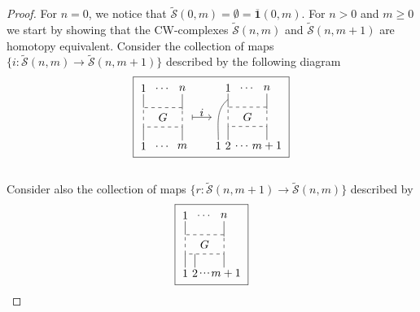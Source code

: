 \documentclass{amsart}
\renewcommand{\S}{\mathcal{S}}
\renewcommand{\1}{\mathbf{1}}
\theoremstyle{definition}
\begin{document}
\begin{proof} 			
	For $n=0$, we notice that $\tilde{\S}(0,m) = \emptyset = \overline{\1}(0,m)$. For $n>0$ and $m\geq0$ we start by showing that the CW-complexes $\tilde{\S}(n,m)$ and $\tilde{\S}(n,m+1)$ are homotopy equivalent. Consider the collection of maps $\{i:\tilde{\S}(n,m)\to\tilde{\S}(n,m+1)\}$ described by the following diagram\\
	\begin{equation*}
	\boxed{\begin{tikzpicture}[scale=.6]
		\node at (0,2) {$1$}; \draw (0,1.7) -- (0,1);
		\node at (1,2) {$\dots$};
		\node at (2,2) {$n$}; \draw (2,1.7) -- (2,.9);
		
		\draw [dashed] (0,0) rectangle (2,1); \node at (1, .5) {$G$};
		
		\node at (0,-1) {$1$}; \draw (0,-.7) -- (0,0);
		\node at (1,-1) {$\dots$};
		\node at (2,-1) {$m$}; \draw (2,-.7) -- (2,0);
		
		\node at (3,.75) {$i$}; \draw [|->] (2.5,.5) -- (3.5,.5);
		\end{tikzpicture}
		\begin{tikzpicture}[scale=.6]
		\node at (0,2) {$1$}; \draw (0,1.7) -- (0,1);
		\node at (1,2) {$\dots$};
		\node at (2,2) {$n$}; \draw (2,1.7) -- (2,.9);
		
		\draw [dashed] (0,0) rectangle (2,1); \node at (1, .5) {$G$};
		
		\node at (-.5,-1) {$1$}; \draw (-.5,-.7)  to[out=90,in=-140]  (0,1.4);
		\node at (0,-1) {$2$}; \draw (0,-.7) -- (0,0);
		\node at (.75,-1) {$\dots$};
		\node at (2,-1) {$m+1$}; \draw (2,-.7) -- (2,0);
		\end{tikzpicture}}
	\end{equation*}\\
	Consider also the collection of maps $\{r:\tilde{\S}(n,m+1)\to\tilde{\S}(n,m)\}$ described by\\
	\begin{equation*}
	\boxed{\begin{tikzpicture}[scale=.6]
		\node at (0,2) {$1$}; \draw (0,1.7) -- (0,1);
		\node at (1,2) {$\dots$};
		\node at (2,2) {$n$}; \draw (2,1.7) -- (2,.9);
		
		\draw [dashed] (0,0) rectangle (2,1); \node at (1, .5) {$G$};
		
		\draw (0,-.7) -- (0,0);
		\node at (0,-1) {$1$};
		\node at (.5,-1) {$2$}; \draw (.5,-.7) -- (.5,0);
		\node at (1,-1) {$\cdot\!\cdot\!\cdot$};
		\node at (2.1,-1) {$m+1$}; \draw (2,-.7) -- (2,0);
		

\end{tikzpicture}}
\end{equation*}
\end{proof}
\end{document}
